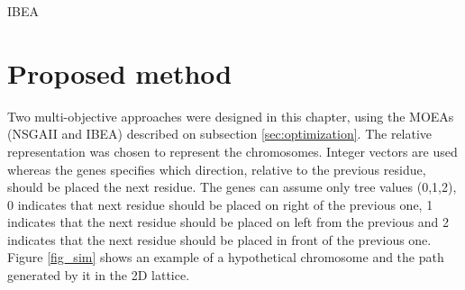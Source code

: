 \begin{algorithm}[htb]
	\begin{algorithmic}[1]
	
	
		
		
		\EndWhile
	
	\EndWhile
	
	\end{algorithmic}
	\caption{IBEA}
	\label{alg:ibea}
\end{algorithm}




\section{Proposed method}
\label{sec:proposedMethod}

Two multi-objective approaches were designed in this chapter, using the MOEAs (NSGAII and IBEA) described on subsection \ref{sec:optimization}. The relative representation was chosen to represent the chromosomes. Integer vectors are used whereas the genes specifies which direction, relative to the previous residue, should be placed the next residue. The genes can assume only tree values (0,1,2), 0 indicates that next residue should be placed on right of the previous one, 1 indicates that the next residue should be placed on left from the previous and 2 indicates that the next residue should be placed in front of the previous one. Figure \ref{fig_sim} shows an example of a hypothetical chromosome and the path generated by it in the 2D lattice.

